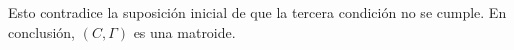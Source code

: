 \documentclass{article}
\begin{document}
Esto contradice la suposición inicial de que la tercera condición no se cumple. En conclusión, $(C,\Gamma)$ es una 
matroide.


\end{document}
